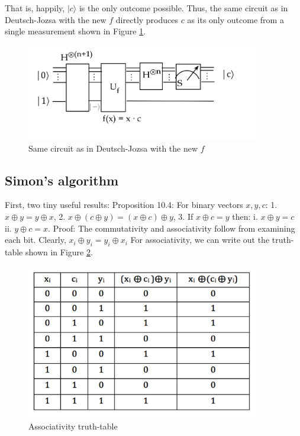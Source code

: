 \documentclass[main.tex]{subfiles}
\begin{document}
    That is, happily, $|c\rangle$ is the only outcome possible. Thus, the same circuit as in Deutsch-Jozsa with the new $f$ directly produces $c$ as its only outcome from a single measurement shown in Figure \ref{fig:19bernstein}.
    
    \begin{figure}
        \centering
        \includegraphics[width=4in]{notes/figs/n11/19bernstein.png}
            \caption{Same circuit as in Deutsch-Jozsa with the new $f$}
        \label{fig:19bernstein}
    \end{figure}

\subsection{Simon's algorithm}

    First, two tiny useful results: Proposition 10.4: For binary vectors $x, y, c$: 1. $x \oplus y=y \oplus x$, 2. $x \oplus(c \oplus y)=(x \oplus c) \oplus y$, 3. If $x \oplus c=y$ then: i. $x \oplus y=c$ ii. $y \oplus c=x$. Proof: The commutativity and associativity follow from examining each bit. Clearly, $x_{i} \oplus y_{i}=y_{i} \oplus x_{i}$ For associativity, we can write out the truth-table shown in Figure \ref{fig:20simon1}.
    
    \begin{figure}
        \centering
        \includegraphics[width=4in]{notes/figs/n11/20simon1.png}
            \caption{Associativity truth-table}
        \label{fig:20simon1}
    \end{figure}
    
\end{document}
